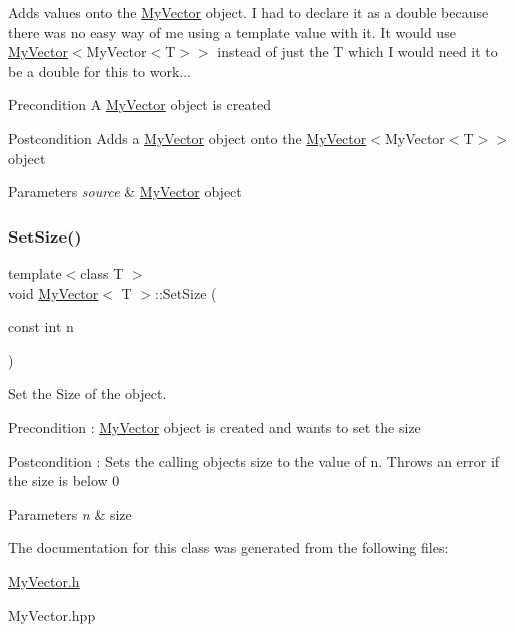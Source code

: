 Adds values onto the \mbox{\hyperlink{class_my_vector}{My\+Vector}} object. I had to declare it as a double because there was no easy way of me using a template value with it. It would use \mbox{\hyperlink{class_my_vector}{My\+Vector}}$<$My\+Vector$<$\+T$>$$>$ instead of just the T which I would need it to be a double for this to work... 

\begin{DoxyPrecond}{Precondition}
A \mbox{\hyperlink{class_my_vector}{My\+Vector}} object is created 
\end{DoxyPrecond}
\begin{DoxyPostcond}{Postcondition}
Add\textquotesingle{}s a \mbox{\hyperlink{class_my_vector}{My\+Vector}} object onto the \mbox{\hyperlink{class_my_vector}{My\+Vector}}$<$My\+Vector$<$\+T$>$$>$ object
\end{DoxyPostcond}

\begin{DoxyParams}{Parameters}
{\em source} & \mbox{\hyperlink{class_my_vector}{My\+Vector}} object \\
\hline
\end{DoxyParams}
\mbox{\label{class_my_vector_a54da580455b3348ddc47a6359e9db444}} 
\subsubsection{\texorpdfstring{SetSize()}{SetSize()}}
{\footnotesize\ttfamily template$<$class T $>$ \\
void \mbox{\hyperlink{class_my_vector}{My\+Vector}}$<$ T $>$\+::Set\+Size (\begin{DoxyParamCaption}\item[{const int}]{n }\end{DoxyParamCaption})}



Set the Size of the object. 

\begin{DoxyPrecond}{Precondition}
\+: \mbox{\hyperlink{class_my_vector}{My\+Vector}} object is created and want\textquotesingle{}s to set the size 
\end{DoxyPrecond}
\begin{DoxyPostcond}{Postcondition}
\+: Sets the calling object\textquotesingle{}s size to the value of n. Throws an error if the size is below 0 
\end{DoxyPostcond}

\begin{DoxyParams}{Parameters}
{\em n} & size \\
\hline
\end{DoxyParams}


The documentation for this class was generated from the following files\+:\begin{DoxyCompactItemize}
\item 
\mbox{\hyperlink{_my_vector_8h}{My\+Vector.\+h}}\item 
My\+Vector.\+hpp\end{DoxyCompactItemize}
